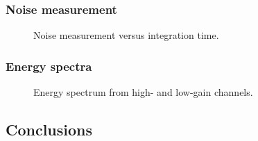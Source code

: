 		    	\subsubsection{Noise measurement}
			\label{sec:DeploymentBeGeSoudanAnalysisNoiseMeasurment}    
			
				\begin{figure}
					\centering
					\caption[Struck noise measurement versus integration time]
					{Noise measurement versus integration time.}
					\label{fig:BeGeTriggeringNoiseMeasurment}
				\end{figure}
						
		    	\subsubsection{Energy spectra}
			\label{sec:DeploymentBeGeSoudanAnalysisEnergySpectra}    		
	
				\begin{figure}
					\centering
					\caption[Struck energy spectrum from high- and low-gain channels]
					{Energy spectrum from high- and low-gain channels.}
					\label{fig:BeGeEnergySpectrum}
				\end{figure}      
				
		\subsection{Conclusions}	
		    





